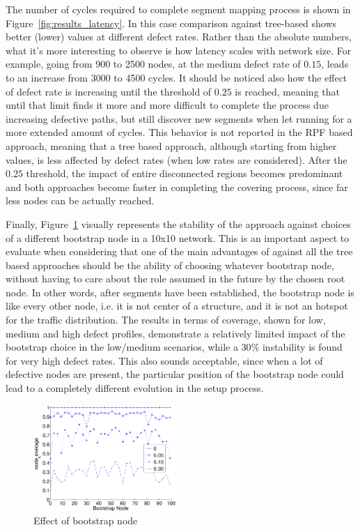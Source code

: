 The number of cycles required to complete segment mapping process
is shown in Figure~\ref{fig:results_latency}. In this case comparison
against tree-based shows better (lower) values at different defect
rates.  Rather than the absolute numbers, what it's more interesting
to observe is how \disr{} latency scales with network size. For example,
going from 900 to 2500 nodes, at the medium defect rate of $0.15$,
leads to an increase from 3000 to 4500 cycles. It should be noticed
also how the effect of defect rate is increasing until the threshold
of $0.25$ is reached, meaning that until that limit \disr{} finds it more
and more difficult to complete the process due increasing defective
paths, but still discover new segments when let running for a more
extended amount of cycles. This behavior is not reported in the RPF
based approach, meaning that a tree based approach, although starting
from higher values, is less affected by defect rates (when low rates
are considered).
After the $0.25$ threshold, the impact of entire disconnected regions
becomes predominant and both approaches become faster in completing
the covering process, since far less nodes can be actually reached. 

Finally, Figure~\ref{fig:results_bootstrap} visually represents  the
stability of the approach against choices of a different bootstrap
node in a 10x10 network.  This is an important aspect to evaluate when
considering that one of the main advantages of \disr{} against all the
tree based approaches should be the ability of choosing whatever
bootstrap node, without having to care about the role assumed in the
future by the chosen root node.  In other words, after segments have
been established, the bootstrap node is like every other node, i.e. it
is not center of a structure, and it is not an hotspot for the traffic
distribution. The results in terms of coverage,  shown for low, medium
and high defect profiles, demonstrate a relatively limited
impact of the bootstrap choice in the low/medium scenarios, while a
$30\%$ instability is found for very high defect rates. This also
sounds acceptable, since when a lot of defective nodes are present, the
particular position of the bootstrap node could lead to a completely
different evolution in the \disr{} setup process.

\begin{figure}
\centering
\includegraphics[width=0.48\textwidth]{pictures/set3.eps}
\caption{Effect of bootstrap node}
\label{fig:results_bootstrap}
\end{figure}

